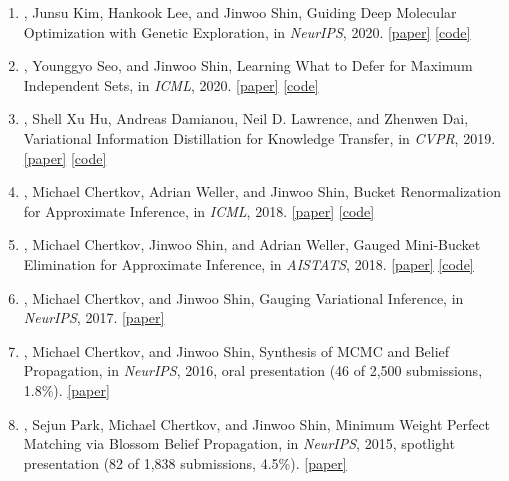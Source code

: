 \begin{enumerate}
\item {}, Junsu Kim, Hankook Lee, and Jinwoo Shin, Guiding Deep Molecular Optimization with Genetic Exploration, in \textit{NeurIPS}, 2020. \mbox{\href{https://arxiv.org/abs/2007.04897}{[paper]}} \mbox{\href{https://github.com/sungsoo-ahn/genetic-expert-guided-learning}{[code]}}
\item {}, Younggyo Seo, and Jinwoo Shin, Learning What to Defer for Maximum Independent Sets, in \textit{ICML}, 2020. \mbox{\href{https://arxiv.org/abs/2006.09607}{[paper]}} \mbox{\href{https://github.com/sungsoo-ahn/learning_what_to_defer}{[code]}}
\item {}, Shell Xu Hu, Andreas Damianou, Neil D. Lawrence, and Zhenwen Dai, Variational Information Distillation for Knowledge Transfer, in \textit{CVPR}, 2019. \mbox{\href{https://arxiv.org/abs/1904.05835}{[paper]}} \mbox{\href{https://github.com/amzn/xfer/tree/master/var_info_distil}{[code]}}
\item {}, Michael Chertkov, Adrian Weller, and Jinwoo Shin, Bucket Renormalization for Approximate Inference, in \textit{ICML}, 2018. \mbox{\href{https://arxiv.org/abs/1803.05104}{[paper]}} \mbox{\href{https://github.com/sungsoo-ahn/bucket-renormalization}{[code]}}
\item {}, Michael Chertkov, Jinwoo Shin, and Adrian Weller, Gauged Mini-Bucket Elimination for Approximate Inference, in \textit{AISTATS}, 2018. \mbox{\href{https://arxiv.org/abs/1801.01649}{[paper]}} \mbox{\href{https://github.com/sungsoo-ahn/gauged-mbe}{[code]}}
\item {}, Michael Chertkov, and Jinwoo Shin, Gauging Variational Inference, in \textit{NeurIPS}, 2017. \mbox{\href{https://arxiv.org/abs/1703.01056}{[paper]}}
\item {}, Michael Chertkov, and Jinwoo Shin, Synthesis of MCMC and Belief Propagation, in \textit{NeurIPS}, 2016, \textcolor{WineRed}{oral presentation (46 of 2,500 submissions, 1.8\%)}. \mbox{\href{https://arxiv.org/abs/1605.09042}{[paper]}}
\item {}, Sejun Park, Michael Chertkov, and Jinwoo Shin, Minimum Weight Perfect Matching via Blossom Belief Propagation, in \textit{NeurIPS}, 2015, \textcolor{WineRed}{spotlight presentation (82 of 1,838 submissions, 4.5\%)}. \mbox{\href{https://arxiv.org/abs/1509.06849}{[paper]}}
\end{enumerate}

